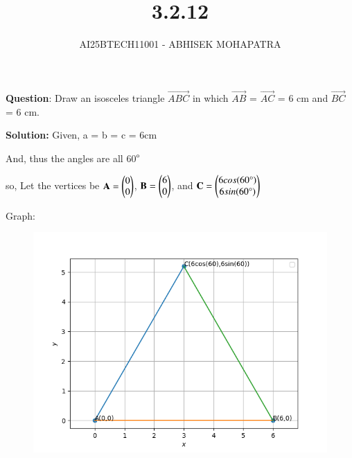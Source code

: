 \documentclass[journal,12pt,onecolumn]{IEEEtran}
\begin{document}
\title{3.2.12}
\author{AI25BTECH11001 - ABHISEK MOHAPATRA}
{\let\newpage\relax\maketitle}
	 	\textbf{Question}:
Draw an isosceles triangle $\vec{ABC}$ in which $\vec{AB}$ = $\vec{AC}$ = 6 cm and $\vec{BC}$ = 6 cm.

		\textbf{Solution:} Given,
		a = b = c = 6cm

		And, thus the angles are all 60$\degree$

		so, Let the vertices be $\mathbf{A} = \begin{pmatrix}0\\0\end{pmatrix}$, $\mathbf{B} = \begin{pmatrix}6\\0\end{pmatrix}$, and $\mathbf{C} = \begin{pmatrix}6cos(60\degree)\\6sin(60\degree)\end{pmatrix}$

		Graph:
\begin{figure}[h!]
	\centering
	\includegraphics[width=0.7\linewidth]{fig1.png}
\end{figure}
\end{document}

